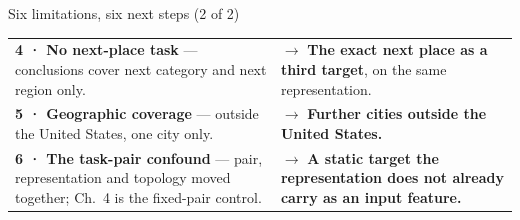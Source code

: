 \documentclass{beamer}
\begin{document}
\begin{frame}{Six limitations, six next steps (2 of 2)}
    \vfill
    {\small
    \setlength{\tabcolsep}{6pt}
    \renewcommand{\arraystretch}{1.35}\begin{tabular}{@{}p{6.2cm} p{7.2cm}@{}}
        \toprule
        {\raggedright \textbf{4 · No next-place task} --- conclusions cover next category and next region only.\par}
            & {\raggedright $\rightarrow$ \textbf{The exact next place as a third target}, on the same representation.\par} \\
        \addlinespace
        {\raggedright \textbf{5 · Geographic coverage} --- outside the United States, one city only.\par}
            & {\raggedright $\rightarrow$ \textbf{Further cities outside the United States.}\par} \\
        \addlinespace
        {\raggedright \textbf{6 · The task-pair confound} --- pair, representation and topology moved together; \alert{Ch.~4 is the fixed-pair control}.\par}
            & {\raggedright $\rightarrow$ \textbf{A static target the representation does not already carry as an input feature.}\par} \\
        \bottomrule
    \end{tabular}
    \par}
    \vfill
\end{frame}
\end{document}
